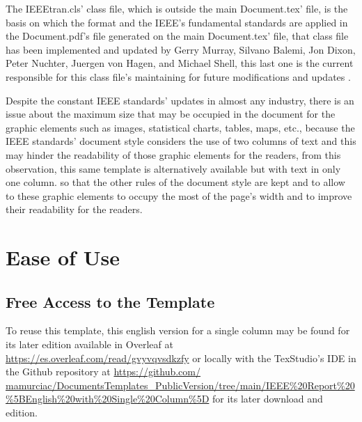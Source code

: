 \documentclass[letterpaper, 10pt, conference]{IEEEtran} %
\begin{document}
	The IEEEtran.cls' class file, which is outside the main Document.tex' file, is the basis on which the format and the IEEE's fundamental standards are applied in the Document.pdf's file generated on the main Document.tex' file, that class file has been implemented and updated by Gerry Murray, Silvano Balemi, Jon Dixon, Peter Nuchter, Juergen von Hagen, and Michael Shell, this last one is the current responsible for this class file's maintaining for future modifications and updates \cite{bibliographicReference2}.
	
	Despite the constant IEEE standards' updates in almost any industry, there is an issue about the maximum size that may be occupied in the document for the graphic elements such as images, statistical charts, tables, maps, etc., because the IEEE standards' document style considers the use of two columns of text and this may hinder the readability of those graphic elements for the readers, from this observation, this same template is alternatively available but with text in only one column. so that the other rules of the document style are kept and to allow to these graphic elements to occupy the most of the page's width and to improve their readability for the readers.
	
	\section{Ease of Use} \label{sectionEaseOfUse}
	\subsection{Free Access to the Template} \label{subsectionFreeAccessToTheTemplate}
	To reuse this template, this english version for a single column may be found for its later edition available in Overleaf at \href{https://es.overleaf.com/read/gvyvqvsdkzfy}{https://es.overleaf.com/read/gvyvqvsdkzfy} or locally with the TexStudio's IDE in the Github repository at \href{https://github.com/mamurciac/DocumentsTemplates_PublicVersion/tree/main/IEEE%20Report%20%5BEnglish%20with%20Single%20Column%5D}{https://github.com/ mamurciac/DocumentsTemplates\_PublicVersion/tree/main/IEEE\%20Report\%20\%5BEnglish\%20with\%20Single\%20Column\%5D} for its later download and edition.
	
\end{document}
